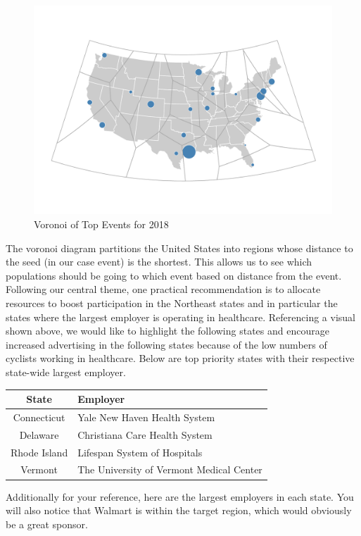 \documentclass[]{article}
\begin{document}
\begin{figure}
\centering
\includegraphics{index_files/figure-latex/voronoi-1.pdf}
\caption{Voronoi of Top Events for 2018}
\end{figure}

The voronoi diagram partitions the United States into regions whose
distance to the seed (in our case event) is the shortest. This allows us
to see which populations should be going to which event based on
distance from the event. Following our central theme, one practical
recommendation is to allocate resources to boost participation in the
Northeast states and in particular the states where the largest employer
is operating in healthcare. Referencing a visual shown above, we would
like to highlight the following states and encourage increased
advertising in the following states because of the low numbers of
cyclists working in healthcare. Below are top priority states with their
respective state-wide largest employer.

\begin{longtable}[]{@{}cl@{}}
\toprule
State & Employer\tabularnewline
\midrule
\endhead
Connecticut & Yale New Haven Health System\tabularnewline
Delaware & Christiana Care Health System\tabularnewline
Rhode Island & Lifespan System of Hospitals\tabularnewline
Vermont & The University of Vermont Medical Center\tabularnewline
\bottomrule
\end{longtable}

Additionally for your reference, here are the largest employers in each
state. You will also notice that Walmart is within the target region,
which would obviously be a great sponsor.
\end{document}
